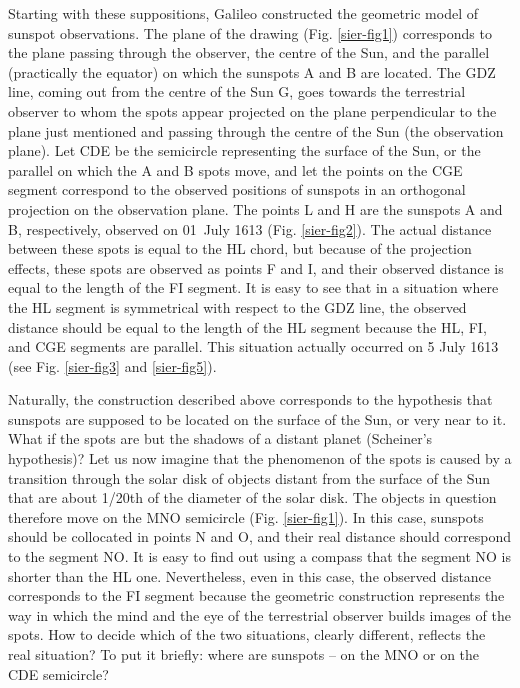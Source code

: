 \begin{artengenv}
Starting with these suppositions, Galileo constructed the geometric model of sunspot observations. The plane of the
drawing (Fig. \ref{sier-fig1}) corresponds to the plane passing through the observer, the centre of the Sun, and the parallel
(practically the equator) on which the sunspots A and B are located. The GDZ line, coming out from the centre of the
Sun G, goes towards the terrestrial observer to whom the spots appear projected on the plane perpendicular to the plane
just mentioned and passing through the centre of the Sun (the observation plane). Let CDE be the semicircle
representing the surface of the Sun, or the parallel on which the A and B spots move, and let the points on the CGE
segment correspond to the observed positions of sunspots in an orthogonal projection on the observation plane. The
points L and H are the sunspots A and B, respectively, observed on 01~July 1613 (Fig. \ref{sier-fig2}). The actual distance between
these spots is equal to the HL chord, but because of the projection effects, these spots are observed as points F and
I, and their observed distance is equal to the length of the FI segment. It is easy to see that in a situation where
the HL segment is symmetrical with respect to the GDZ line, the observed distance should be equal to the length of the
HL segment because the HL, FI, and CGE segments are parallel. This situation actually occurred on 5 July 1613 (see Fig.
\ref{sier-fig3} and \ref{sier-fig5}).

Naturally, the construction described above corresponds to the hypothesis that sunspots are supposed to be located on
the surface of the Sun, or very near to it. What if the spots are but the shadows of a distant planet (Scheiner’s
hypothesis)? Let us now imagine that the phenomenon of the spots is caused by a transition through the solar disk of
objects distant from the surface of the Sun that are about 1/20th of the diameter of the solar disk. The objects in
question therefore move on the MNO semicircle (Fig. \ref{sier-fig1}). In this case, sunspots should be collocated in points N and O,
and their real distance should correspond to the segment NO. It is easy to find out using a compass that the segment NO
is shorter than the HL one. Nevertheless, even in this case, the observed distance corresponds to the FI segment
because the geometric construction represents the way in which the mind and the eye of the terrestrial observer builds
images of the spots. How to decide which of the two situations, clearly different, reflects the real situation? To put
it briefly: where are sunspots -- on the MNO or on the CDE semicircle?


\end{artengenv}
